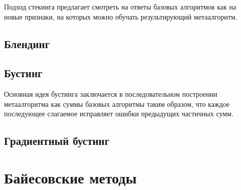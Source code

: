 Подход стекинга предлагает смотреть на ответы базовых алгоритмов как на новые признаки, на которых можно обучать результирующий метаалгоритм.

\subsection{Блендинг}

\subsection{Бустинг}

Основная идея бустинга заключается в последовательном построении метаалгоритма как суммы базовых алгоритмы таким образом, что каждое последующее слагаемое исправляет ошибки предыдущих частичных сумм.

\subsection{Градиентный бустинг}


\section{Байесовские методы}



